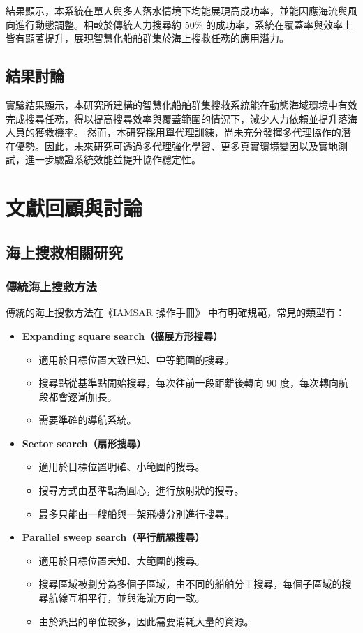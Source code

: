 \documentclass[12pt,a4paper]{article}
\begin{document}
結果顯示，本系統在單人與多人落水情境下均能展現高成功率，並能因應海流與風向進行動態調整。相較於傳統人力搜尋約 50\% 的成功率，系統在覆蓋率與效率上皆有顯著提升，展現智慧化船舶群集於海上搜救任務的應用潛力。


\subsection{結果討論}
實驗結果顯示，本研究所建構的智慧化船舶群集搜救系統能在動態海域環境中有效完成搜尋任務，得以提高搜尋效率與覆蓋範圍的情況下，減少人力依賴並提升落海人員的獲救機率。  然而，本研究採用單代理訓練，尚未充分發揮多代理協作的潛在優勢。因此，未來研究可透過多代理強化學習、更多真實環境變因以及實地測試，進一步驗證系統效能並提升協作穩定性。



\newpage

\section{文獻回顧與討論}

\subsection{海上搜救相關研究}

\subsubsection{傳統海上搜救方法}
傳統的海上搜救方法在《IAMSAR 操作手冊》\cite{IAMSAR2008}\cite{Oways} 中有明確規範，常見的類型有：
\begin{itemize}
	\item \textbf{Expanding square search（擴展方形搜尋）}
	\begin{itemize}
		\item 適用於目標位置大致已知、中等範圍的搜尋。
		\item 搜尋點從基準點開始搜尋，每次往前一段距離後轉向 90 度，每次轉向航段都會逐漸加長。
		\item 需要準確的導航系統。
	\end{itemize}
	\item \textbf{Sector search（扇形搜尋）}
	\begin{itemize}
		\item 適用於目標位置明確、小範圍的搜尋。
		\item 搜尋方式由基準點為圓心，進行放射狀的搜尋。
		\item 最多只能由一艘船與一架飛機分別進行搜尋。
	\end{itemize}
	\item \textbf{Parallel sweep search（平行航線搜尋）}
	\begin{itemize}
		\item 適用於目標位置未知、大範圍的搜尋。
		\item 搜尋區域被劃分為多個子區域，由不同的船舶分工搜尋，每個子區域的搜尋航線互相平行，並與海流方向一致。
		\item 由於派出的單位較多，因此需要消耗大量的資源。
	\end{itemize}
\end{itemize}
\end{document}
